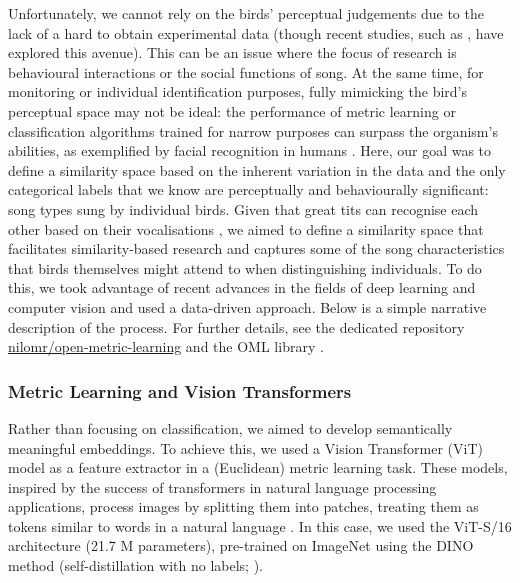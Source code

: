 Unfortunately, we cannot rely on the birds' perceptual judgements due to the lack of a hard to obtain experimental data (though recent studies, such as \cite{morfi2021, zandberg2022}, have explored this avenue). This can be an issue where the focus of research is behavioural interactions or the social functions of song. At the same time, for monitoring or individual identification purposes, fully mimicking the bird's perceptual space may not be ideal: the performance of metric learning or classification algorithms trained for narrow purposes can surpass the organism's abilities, as exemplified by facial recognition in humans \parencite{lu2014}. Here, our goal was to define a similarity space based on the inherent variation in the data and the only categorical labels that we know are perceptually and behaviourally significant: song types sung by individual birds. Given that great tits can recognise each other based on their vocalisations \parencite{lind1996}, we aimed to define a similarity space that facilitates similarity-based research and captures some of the song characteristics that birds themselves might attend to when distinguishing individuals. To do this, we took advantage of recent advances in the fields of deep learning and computer vision and used a data-driven approach. Below is a simple narrative description of the process. For further details, see the dedicated repository \href{https://github.com/nilomr/open-metric-learning/tree/great-tit}{nilomr/open-metric-learning} and the OML library \parencite{shabanov2023}. 


\subsubsection{Metric Learning and Vision Transformers}
Rather than focusing on classification, we aimed to develop semantically meaningful embeddings. To achieve this, we used a Vision Transformer (ViT) model as a feature extractor in a (Euclidean) metric learning task. These models, inspired by the success of transformers in natural language processing applications, process images by splitting them into patches, treating them as tokens similar to words in a natural language \parencite{dosovitskiy2021, raghu2022}. In this case, we used the ViT-S/16 architecture (21.7 M parameters), pre-trained on ImageNet using the DINO method (self-distillation with no labels; \cite{caron2021}).

